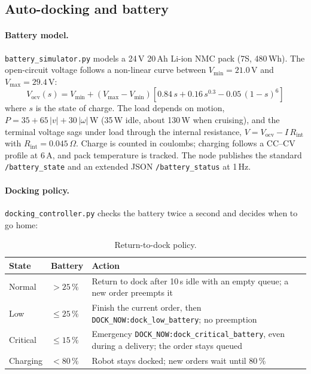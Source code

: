 \documentclass[11pt,a4paper]{article}
\begin{document}
\subsection{Auto-docking and battery}

\paragraph{Battery model.} \texttt{battery\_simulator.py} models a 24\,V
20\,Ah Li-ion NMC pack (7S, 480\,Wh). The open-circuit voltage follows a
non-linear curve between $V_\text{min}=21.0$\,V and $V_\text{max}=29.4$\,V:
\[
  V_\text{ocv}(s) = V_\text{min} + (V_\text{max}-V_\text{min})\left[0.84\,s + 0.16\,s^{0.3} - 0.05\,(1-s)^6\right]
\]
where $s$ is the state of charge. The load depends on motion,
$P = 35 + 65\,|v| + 30\,|\omega|$\,W (35\,W idle, about 130\,W when
cruising), and the terminal voltage sags under load through the internal
resistance, $V = V_\text{ocv} - I\,R_\text{int}$ with
$R_\text{int}=0.045\,\Omega$. Charge is counted in coulombs; charging
follows a CC--CV profile at 6\,A, and pack temperature is tracked. The node
publishes the standard \texttt{/battery\_state} and an extended JSON
\texttt{/battery\_status} at 1\,Hz.

\paragraph{Docking policy.} \texttt{docking\_controller.py} checks the
battery twice a second and decides when to go home:

\begin{table}[H]
\centering
\begin{tabularx}{\linewidth}{l l L}
\toprule
\textbf{State} & \textbf{Battery} & \textbf{Action} \\
\midrule
Normal & $> 25\,\%$ & Return to dock after 10\,s idle with an empty queue; a new order preempts it \\
Low & $\leq 25\,\%$ & Finish the current order, then \texttt{DOCK\_NOW:dock\_low\_battery}; no preemption \\
Critical & $\leq 15\,\%$ & Emergency \texttt{DOCK\_NOW:dock\_critical\_battery}, even during a delivery; the order stays queued \\
Charging & $< 80\,\%$ & Robot stays docked; new orders wait until 80\,\% \\
\bottomrule
\end{tabularx}
\caption{Return-to-dock policy.}
\end{table}
\end{document}
